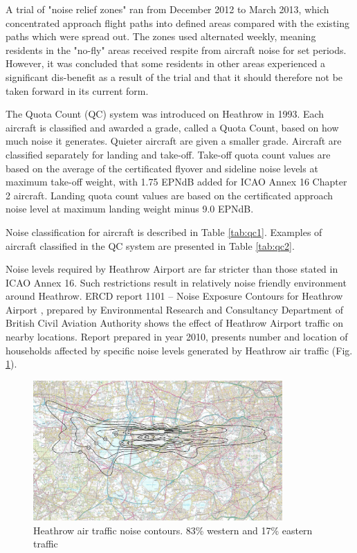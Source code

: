 A trial of "noise relief zones" ran from December 2012 to March 2013, which concentrated approach flight paths into defined areas compared with the existing paths which were spread out. The zones used alternated weekly, meaning residents in the "no-fly" areas received respite from aircraft noise for set periods. However, it was concluded that some residents in other areas experienced a significant dis-benefit as a result of the trial and that it should therefore not be taken forward in its current form.

The Quota Count (QC) system was introduced on Heathrow in 1993. Each aircraft is classified and awarded a grade, called a Quota Count, based on how much noise it generates. Quieter aircraft are given a smaller grade.  Aircraft are classified separately for landing and take-off. Take-off quota count values are based on the average of the certificated flyover and sideline noise levels at maximum take-off weight, with 1.75 EPNdB added for ICAO Annex 16 Chapter 2 aircraft. Landing quota count values are based on the certificated approach noise level at maximum landing weight minus 9.0 EPNdB.

Noise classification for aircraft is described in Table \ref{tab:qc1}. Examples of aircraft classified in the QC system are presented in Table \ref{tab:qc2}.

Noise levels required by Heathrow Airport are far stricter than those stated in ICAO Annex 16. Such restrictions result in relatively noise friendly environment around Heathrow. ERCD report 1101 – Noise Exposure Contours for Heathrow Airport \citep{ERCD}, prepared by Environmental Research and Consultancy Department of British Civil Aviation Authority shows the effect of Heathrow Airport traffic on nearby locations. Report prepared in year 2010, presents number and location of households affected by specific noise levels generated by Heathrow air traffic (Fig. \ref{heathrow}).

\begin{figure}[h!]
\centering %
\includegraphics[width=0.85\textwidth]{Pictures/heathrow.png}
\caption{Heathrow air traffic noise contours. 83\% western and 17\% eastern traffic \citep{ERCD}}
\label{heathrow}
\end{figure}

